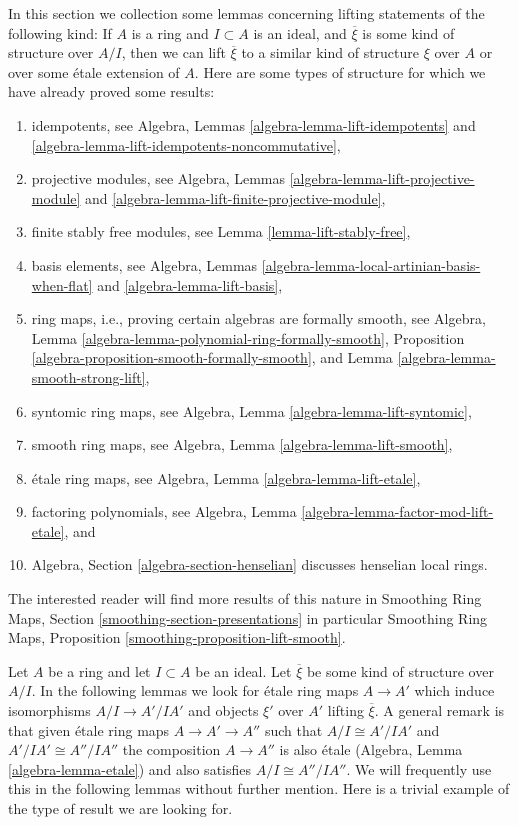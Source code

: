 \noindent
In this section we collection some lemmas concerning lifting
statements of the following kind: If $A$ is a ring and $I \subset A$
is an ideal, and $\overline{\xi}$ is some kind of structure over
$A/I$, then we can lift $\overline{\xi}$ to a similar kind of structure
$\xi$ over $A$ or over some \'etale extension of $A$. Here are some types
of structure for which we have already proved some results:
\begin{enumerate}
\item idempotents, see
Algebra, Lemmas \ref{algebra-lemma-lift-idempotents} and
\ref{algebra-lemma-lift-idempotents-noncommutative},
\item projective modules, see
Algebra, Lemmas \ref{algebra-lemma-lift-projective-module} and
\ref{algebra-lemma-lift-finite-projective-module},
\item finite stably free modules, see Lemma \ref{lemma-lift-stably-free},
\item basis elements, see
Algebra, Lemmas \ref{algebra-lemma-local-artinian-basis-when-flat} and
\ref{algebra-lemma-lift-basis},
\item ring maps, i.e., proving certain algebras are formally smooth, see
Algebra, Lemma \ref{algebra-lemma-polynomial-ring-formally-smooth},
Proposition \ref{algebra-proposition-smooth-formally-smooth}, and
Lemma \ref{algebra-lemma-smooth-strong-lift},
\item syntomic ring maps, see
Algebra, Lemma \ref{algebra-lemma-lift-syntomic},
\item smooth ring maps, see
Algebra, Lemma \ref{algebra-lemma-lift-smooth},
\item \'etale ring maps, see
Algebra, Lemma \ref{algebra-lemma-lift-etale},
\item factoring polynomials, see
Algebra, Lemma \ref{algebra-lemma-factor-mod-lift-etale}, and
\item Algebra, Section \ref{algebra-section-henselian} discusses henselian
local rings.
\end{enumerate}
The interested reader will find more results of this nature in
Smoothing Ring Maps, Section \ref{smoothing-section-presentations}
in particular
Smoothing Ring Maps, Proposition \ref{smoothing-proposition-lift-smooth}.

\medskip\noindent
Let $A$ be a ring and let $I \subset A$ be an ideal. Let $\overline{\xi}$
be some kind of structure over $A/I$. In the following lemmas we look for
\'etale ring maps $A \to A'$ which induce isomorphisms $A/I \to A'/IA'$
and objects $\xi'$ over $A'$ lifting $\overline{\xi}$. A general remark is
that given \'etale ring maps $A \to A' \to A''$ such that
$A/I \cong A'/IA'$ and $A'/IA' \cong A''/IA''$ the composition
$A \to A''$ is also \'etale (Algebra, Lemma \ref{algebra-lemma-etale})
and also satisfies $A/I \cong A''/IA''$.
We will frequently use this in the following lemmas without further mention.
Here is a trivial example of the type of result we are looking for.

